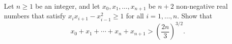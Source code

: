 Let $n \geq 1$ be an integer, and let $x_0,x_1,\ldots,x_{n+1}$ be $n+2$ non-negative real numbers that satisfy $x_i x_{i+1} - x_{i-1}^2 \geq 1$ for all $i=1,\ldots,n$. Show that
\[ x_0 + x_1 + \cdots + x_n + x_{n+1} > \left( \frac{2n}{3} \right)^{3/2}. \]
